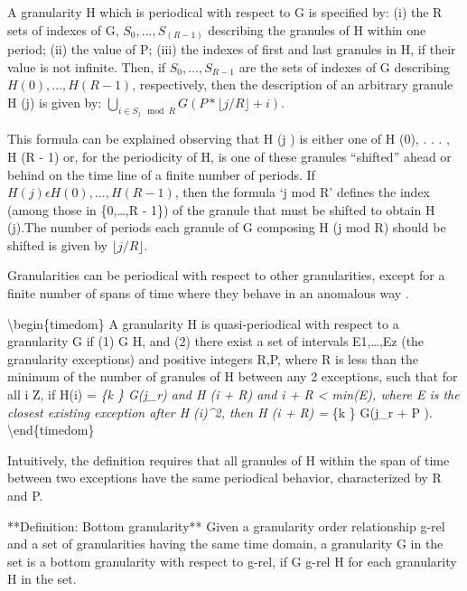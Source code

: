 \documentclass[12pt]{article}
\begin{document}
A granularity H which is periodical with respect to G is specified by:
(i) the R sets of indexes of G, \({S_0,...,S_(R-1)}\) describing the
granules of H within one period; (ii) the value of P; (iii) the indexes
of first and last granules in H, if their value is not infinite. Then,
if \({S_0,...,S_{R-1}}\) are the sets of indexes of G describing
\(H (0), . . . , H (R - 1)\), respectively, then the description of an
arbitrary granule H (j) is given by:
\(\bigcup_{i \in S_j \mod R}G(P*\lfloor j/R \rfloor + i)\).

This formula can be explained observing that H (j ) is either one of H
(0), . . . , H (R - 1) or, for the periodicity of H, is one of these
granules ``shifted'' ahead or behind on the time line of a finite number
of periods. If \(H (j ) \epsilon {H (0), . . . , H (R - 1)}\), then the
formula `j mod R' defines the index (among those in \{0,\ldots{},R -
1\}) of the granule that must be shifted to obtain H (j).The number of
periods each granule of G composing H (j mod R) should be shifted is
given by \(\lfloor j/R \rfloor\).

Granularities can be periodical with respect to other granularities,
except for a finite number of spans of time where they behave in an
anomalous way \citep{Bettini2000-vy}.

\textbackslash{}begin\{timedom\}\label{def:quasi} A granularity H is
quasi-periodical with respect to a granularity G if (1) G
\trianglelefteq H, and (2) there exist a set of intervals E1,\ldots{},Ez
(the granularity exceptions) and positive integers R,P, where R is less
than the minimum of the number of granules of H between any 2
exceptions, such that for all i \epsilon Z, if H(i) = \bigcup\emph{\{k
\in [0,k]\} G(j\_r) and H (i + R) \neq \phi and i + R \textless{}
min(E), where E is the closest existing exception after H (i)\^{}2, then
H (i + R) = \bigcup}\{k \in [0,k]\} G(j\_r + P ).
\textbackslash{}end\{timedom\}

Intuitively, the definition requires that all granules of H within the
span of time between two exceptions have the same periodical behavior,
characterized by R and P.

\begin{timedom}\label{def:BG}
**Definition: Bottom granularity** Given a granularity order relationship g-rel and a set of granularities having the same time domain, a granularity G in the set is a bottom granularity with respect to g-rel, if G g-rel H for each granularity H in the set. 
\end{timedom}
\end{document}
